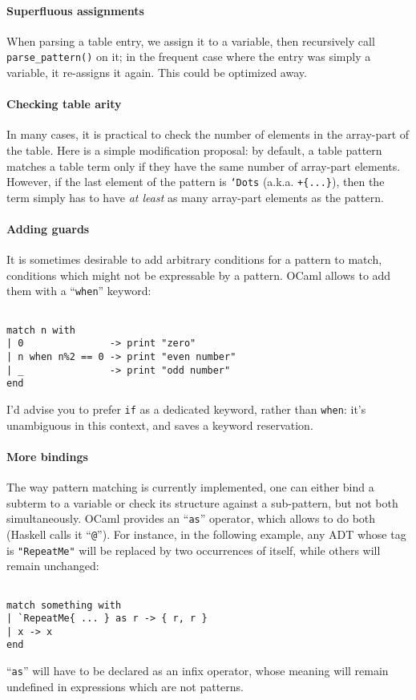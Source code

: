 \paragraph{Superfluous assignments} When parsing a table entry, we
assign it to a variable, then recursively call {\tt parse\_pattern()}
on it; in the frequent case where the entry was simply a variable, it
re-assigns it again. This could be optimized away.

\paragraph{Checking table arity} In many cases, it is practical to
check the number of elements in the array-part of the table. Here is a
simple modification proposal: by default, a table pattern matches a
table term only if they have the same number of array-part
elements. However, if the last element of the pattern is {\tt`Dots}
(a.k.a. {\tt+\{...\}}), then the term simply has to have 
{\it at least} as many array-part elements as the pattern.

\paragraph{Adding guards}
It is sometimes desirable to add arbitrary conditions for a pattern to
match, conditions which might not be expressable by a pattern. OCaml
allows to add them with a ``\verb|when|'' keyword:
\begin{Verbatim}[fontsize=\scriptsize]

match n with
| 0               -> print "zero"
| n when n%2 == 0 -> print "even number"
| _               -> print "odd number"
end
\end{Verbatim}
I'd advise you to prefer {\tt if} as a dedicated keyword, rather than
{\tt when}: it's unambiguous in this context, and saves a keyword
reservation. 

\paragraph{More bindings}
The way pattern matching is currently implemented, one can either bind
a subterm to a variable or check its structure against a sub-pattern,
but not both simultaneously. OCaml provides an ``\verb|as|'' operator,
which allows to do both (Haskell calls it ``\verb|@|''). For instance,
in the following example, any ADT whose tag is \verb|"RepeatMe"| will
be replaced by two occurrences of itself, while others will remain
unchanged:
\begin{Verbatim}[fontsize=\scriptsize]

match something with
| `RepeatMe{ ... } as r -> { r, r }
| x -> x
end
\end{Verbatim}
``\verb|as|'' will have to be declared as an infix operator, whose
meaning will remain undefined in expressions which are not patterns.

